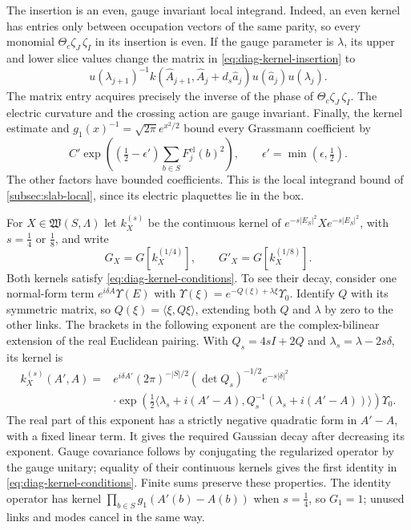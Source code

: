 The insertion is an even, gauge invariant local integrand. Indeed,
an even kernel has entries only between occupation vectors of the
same parity, so every monomial
$\Theta_c\zeta_J\,\zeta_I$ in its insertion is even. If the gauge
parameter is $\lambda$, its upper and lower slice values change
the matrix in \eqref{eq:diag-kernel-insertion} to
\[
 u(\lambda_{j+1})^{-1}
   k(\widehat A_{j+1},\widehat A_j+d_s\widehat a_j)
       u(\widehat a_j)u(\lambda_j).
\]
The matrix entry acquires precisely the inverse of the phase of
$\Theta_c\zeta_J\,\zeta_I$. The electric curvature and the crossing
action are gauge invariant. Finally, the kernel estimate and
$g_1(x)^{-1}=\sqrt{2\pi}e^{x^2/2}$ bound every Grassmann coefficient
by
\begin{equation}\label{eq:diag-insertion-growth}
 C'\exp\left((\tfrac12-\epsilon')
                 \sum_{b\in S}F_j^{\mathrm{el}}(b)^2\right),
 \qquad\epsilon'=\min(\epsilon,\tfrac12).
\end{equation}
The other factors have bounded coefficients. This is the local
integrand bound of \cref{subsec:slab-local}, since its electric
plaquettes lie in the box.

For $X\in\mathfrak W(S,\Lambda)$ let $k_X^{(s)}$ be the continuous
kernel of $e^{-s|E_S|^2}Xe^{-s|E_S|^2}$, with $s=\tfrac14$ or
$\tfrac18$, and write
\begin{equation}\label{eq:diag-operator-insertions}
 G_X=G[k_X^{(1/4)}],\qquad G'_X=G[k_X^{(1/8)}].
\end{equation}
Both kernels satisfy \eqref{eq:diag-kernel-conditions}. To see their
decay, consider one normal-form term $e^{i\delta A}\Upsilon(E)$ with
$\Upsilon(\xi)=e^{-Q(\xi)+\lambda\xi}\Upsilon_0$. Identify $Q$
with its symmetric matrix, so $Q(\xi)=\langle\xi,Q\xi\rangle$,
extending both $Q$ and $\lambda$ by zero to the other links.
The brackets in the following exponent are the complex-bilinear
extension of the real Euclidean pairing. With $Q_s=4sI+2Q$ and
$\lambda_s=\lambda-2s\delta$, its kernel is
\begin{equation}\label{eq:diag-regularized-kernel}
 \begin{split}
 k_X^{(s)}(A',A)={}&e^{i\delta A'}(2\pi)^{-|S|/2}
          (\det Q_s)^{-1/2}e^{-s|\delta|^2}\\
 &\cdot\exp\left(\tfrac12
  \langle\lambda_s+i(A'-A),Q_s^{-1}
                  (\lambda_s+i(A'-A))\rangle\right)\Upsilon_0.
 \end{split}
\end{equation}
The real part of this exponent has a strictly negative quadratic
form in $A'-A$, with a fixed linear term. It gives the required
Gaussian decay after decreasing its exponent. Gauge covariance
follows by conjugating the regularized operator by the gauge
unitary; equality of their continuous kernels gives the first
identity in \eqref{eq:diag-kernel-conditions}. Finite sums preserve
these properties. The identity operator has kernel
$\prod_{b\in S}g_1(A'(b)-A(b))$ when $s=\tfrac14$, so
$G_1=1$; unused links and modes cancel in the same way.

